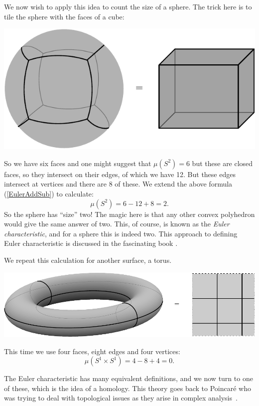 \documentclass[11pt,oneside]{report}
\newcommand{\Eref}[1]{(\ref{#1})}
\def\euler{\mu}
\begin{document}
We now wish to apply this idea to count the
size of a sphere. The trick here is to tile the
sphere with the faces of a cube:
\begin{center}
\includegraphics{pic-cube.pdf}
\end{center}
So we have six faces and one might suggest that 
$\euler(S^2)=6$ but these are closed faces, so they
intersect on their edges, of which we have 12.
But these edges intersect at vertices and there are
8 of these. 
We extend the above formula \Eref{EulerAddSub} to calculate:
$$
    \euler(S^2) = 6 - 12 + 8 = 2.
$$
So the sphere has ``size'' two!
The magic here is that any other convex polyhedron would give
the same answer of two.
This, of course, is known as the \emph{Euler characteristic},
and for a sphere this is indeed two.
{This approach to defining Euler characteristic is
discussed in the fascinating book \cite{Klain1997}.}

We repeat this calculation for another surface, a torus.
\begin{center}
\includegraphics[width=1.0\columnwidth]{pic-torus.pdf}
\end{center}
This time we use four faces, eight edges and four vertices:
$$
    \euler(S^1\times S^1) = 4 - 8 + 4 = 0.
$$

The Euler characteristic has many equivalent definitions,
and we now turn to one of these, which is the idea of a homology.
This theory goes back to Poincar\'e who was trying to
deal with topological issues as they arise in complex analysis~\cite{Lefschetz1970}.
\end{document}
